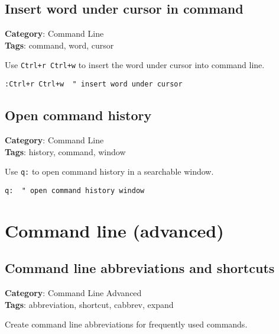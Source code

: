 {{{{\section{Insert word under cursor in command}

\textbf{Category}: Command Line\\ \textbf{Tags}: command, word, cursor
\vspace{0.5cm}

Use {\footnotesize \Verb§Ctrl+r Ctrl+w§} to insert the word under cursor into command line.

\begin{Exa*}{}
\begin{Verbatim}[fontsize=\footnotesize, breaklines, breakanywhere]
:Ctrl+r Ctrl+w  " insert word under cursor
\end{Verbatim}
\end{Exa*}

\section{Open command history}

\textbf{Category}: Command Line\\ \textbf{Tags}: history, command, window
\vspace{0.5cm}

Use {\footnotesize \Verb§q:§} to open command history in a searchable window.

\begin{Exa*}{}
\begin{Verbatim}[fontsize=\footnotesize, breaklines, breakanywhere]
q:  " open command history window
\end{Verbatim}
\end{Exa*}

\chapter{Command line (advanced)}
\section{Command line abbreviations and shortcuts}

\textbf{Category}: Command Line Advanced\\ \textbf{Tags}: abbreviation, shortcut, cabbrev, expand
\vspace{0.5cm}

Create command line abbreviations for frequently used commands.

}}}}
